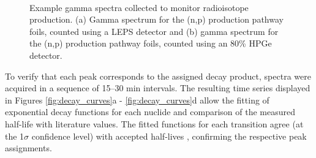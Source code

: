 \begin{figure}[ht]
    \centering
    \\
    \caption{Example gamma spectra collected to monitor radioisotope production. (a)  Gamma spectrum for the (n,p) production pathway foils, counted using a LEPS detector and (b) gamma spectrum for the (n,p) production pathway foils, counted using an 80\% HPGe detector.}
     \label{fig:main_spectra}
\end{figure}


To verify that each peak corresponds to the assigned decay product, spectra were acquired in a sequence of 15--30 min intervals.
The resulting time series displayed in Figures \ref{fig:decay_curves}a - \ref{fig:decay_curves}d allow the fitting of exponential decay functions for each nuclide and comparison of the measured half-life with literature values.
The fitted functions for each transition agree (at the 1$\sigma$ confidence level) with accepted half-lives \cite{Burrows2007,Singh2007,Blachot2010a,Blachot2012,Blachot2010}, confirming the respective peak assignments.


